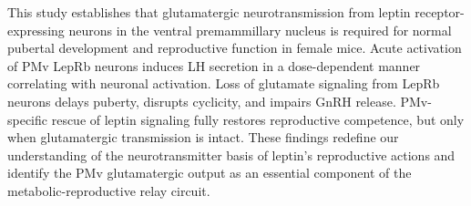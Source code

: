 \documentclass[12pt]{article}
\begin{document}
This study establishes that glutamatergic neurotransmission from leptin receptor-expressing neurons in the ventral premammillary nucleus is required for normal pubertal development and reproductive function in female mice. Acute activation of PMv LepRb neurons induces LH secretion in a dose-dependent manner correlating with neuronal activation. Loss of glutamate signaling from LepRb neurons delays puberty, disrupts cyclicity, and impairs GnRH release. PMv-specific rescue of leptin signaling fully restores reproductive competence, but only when glutamatergic transmission is intact. These findings redefine our understanding of the neurotransmitter basis of leptin's reproductive actions and identify the PMv glutamatergic output as an essential component of the metabolic-reproductive relay circuit.



\end{document}
